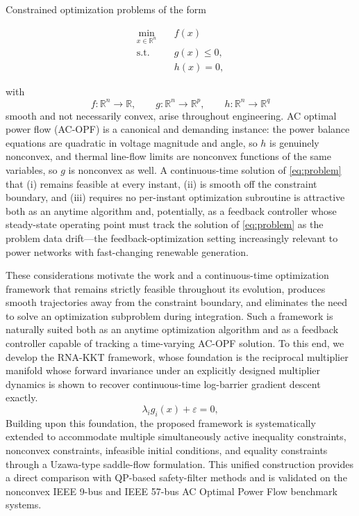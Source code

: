 \documentclass[11pt,onecolumn]{article}
\theoremstyle{definition}
\theoremstyle{remark}
\begin{document}
Constrained optimization problems of the form

\begin{equation}
\begin{aligned}
\min_{x\in\mathbb{R}^n} \quad & f(x) \\
\text{s.t.} \quad & g(x) \leq 0, \\
                  & h(x) = 0,
\end{aligned}
\label{eq:problem}
\end{equation}

with
\[
f:\mathbb{R}^n \rightarrow \mathbb{R}, \qquad
g:\mathbb{R}^n \rightarrow \mathbb{R}^p, \qquad
h:\mathbb{R}^n \rightarrow \mathbb{R}^q
\]
smooth and not necessarily convex, arise throughout engineering. AC optimal power
flow (AC-OPF) is a canonical and demanding instance: the power balance equations
are quadratic in voltage magnitude and angle, so \(h\) is genuinely nonconvex, and
thermal line-flow limits are nonconvex functions of the same variables, so \(g\) is
nonconvex as well. A continuous-time solution of \eqref{eq:problem} that
(i) remains feasible at every instant,
(ii) is smooth off the constraint boundary, and
(iii) requires no per-instant optimization subroutine
is attractive both as an anytime algorithm and, potentially, as a feedback controller
whose steady-state operating point must track the solution of \eqref{eq:problem}
as the problem data drift—the feedback-optimization setting increasingly relevant
to power networks with fast-changing renewable generation.
 

These considerations motivate the work and a continuous-time optimization framework that remains strictly feasible throughout its evolution, produces smooth trajectories away from the constraint boundary, and eliminates the need to solve an optimization subproblem during integration. Such a framework is naturally suited both as an anytime optimization algorithm and as a feedback controller capable of tracking a time-varying AC-OPF solution. To this end, we develop the RNA-KKT framework, whose foundation is the reciprocal multiplier manifold whose forward invariance under an explicitly designed multiplier dynamics is shown to recover continuous-time log-barrier gradient descent exactly.
\[
\lambda_i g_i(x) + \varepsilon = 0,
\]
 Building upon this foundation, the proposed framework is systematically extended to accommodate multiple simultaneously active inequality constraints, nonconvex constraints, infeasible initial conditions, and equality constraints through a Uzawa-type saddle-flow formulation. This unified construction provides a direct comparison with QP-based safety-filter methods and is validated on the nonconvex IEEE 9-bus and IEEE 57-bus AC Optimal Power Flow benchmark systems.
\end{document}
